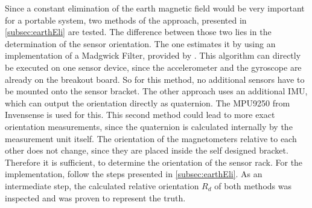 Since a constant elimination of the earth magnetic field would be very important for a portable system, two methods of the approach, presented in \ref{subsec:earthEli} are tested. The difference between those two lies in the determination of the sensor orientation. The one estimates it by using an implementation of a Madgwick Filter, provided by \cite{mikeshub2012}. This algorithm can directly be executed on one sensor device, since the accelerometer and the gyroscope are already on the breakout board. So for this method, no additional sensors have to be mounted onto the sensor bracket. The other approach uses an additional \ac{IMU}, which can output the orientation directly as quaternion. The MPU9250 from Invensense \cite{MPU2014} is used for this. This second method could lead to more exact orientation measurements, since the quaternion is calculated internally by the measurement unit itself. The orientation of the magnetometers relative to each other does not change, since they are placed inside the self designed bracket. Therefore it is sufficient, to determine the orientation of the sensor rack. For the implementation, follow the steps presented in \ref{subsec:earthEli}. As an intermediate step, the calculated relative orientation $ R_{d} $ of both methods was inspected and was proven to represent the truth.

